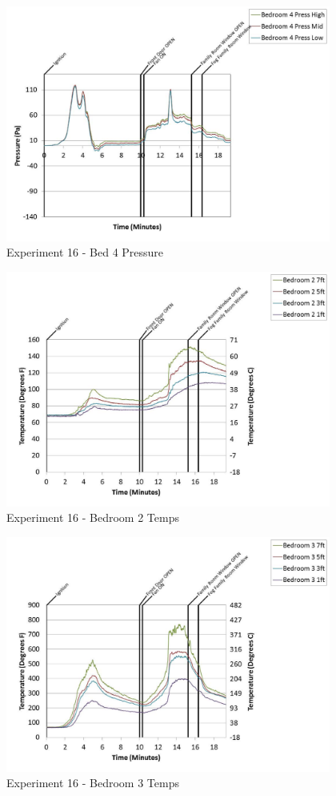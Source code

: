 \documentclass{article}
\begin{document}
\begin{appendices}
	\clearpage

	\begin{figure}[h!]
		\centering
		\includegraphics[height=3.05in]{0_Images/Results_Charts/Exp_16_Charts/Bed4Pressure.pdf}
		\caption{Experiment 16 - Bed 4 Pressure}
	\end{figure}
 

	\begin{figure}[h!]
		\centering
		\includegraphics[height=3.05in]{0_Images/Results_Charts/Exp_16_Charts/Bedroom2Temps.pdf}
		\caption{Experiment 16 - Bedroom 2 Temps}
	\end{figure}
 
	\clearpage

	\begin{figure}[h!]
		\centering
		\includegraphics[height=3.05in]{0_Images/Results_Charts/Exp_16_Charts/Bedroom3Temps.pdf}
		\caption{Experiment 16 - Bedroom 3 Temps}
	\end{figure}
 


\end{appendices}
\end{document}
